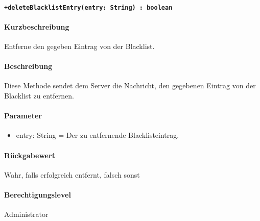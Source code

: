 \paragraph{\texttt{+deleteBlacklistEntry(entry: String) : boolean}}%
\paragraph*{Kurzbeschreibung}
Entferne den gegeben Eintrag von der Blacklist.
\paragraph*{Beschreibung}
Diese Methode sendet dem Server die Nachricht, den gegebenen Eintrag von der Blacklist zu entfernen.
\paragraph*{Parameter}
\begin{itemize}
    \item entry: String = Der zu entfernende Blacklisteintrag.
\end{itemize}
\paragraph*{Rückgabewert}
Wahr, falls erfolgreich entfernt, falsch sonst
\paragraph*{Berechtigungslevel}
Administrator